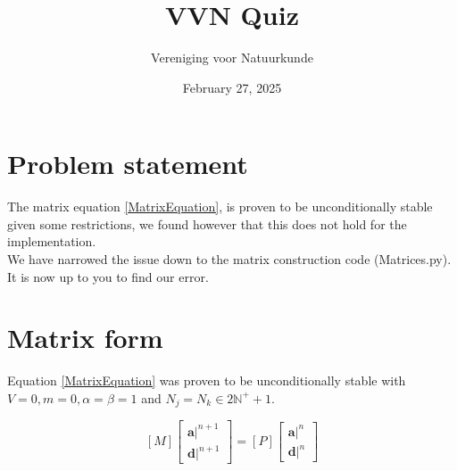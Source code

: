 \documentclass[final, 11pt]{article}
\title{VVN Quiz}
\date{February 27, 2025}
\author{Vereniging voor Natuurkunde}
\begin{document}
\maketitle

\section{Problem statement}
The matrix equation \ref{MatrixEquation}, is proven to be unconditionally stable given some restrictions, we found however that this does not hold for the implementation.
\\
We have narrowed the issue down to the matrix construction code (Matrices.py).
\\
It is now up to you to find our error.

\pagebreak

\section{Matrix form}
Equation \ref{MatrixEquation} was proven to be unconditionally stable with \(V=0, m=0, \alpha=\beta=1\) and \( N_j = N_k \in 2\mathbb{N}^{+}+1\).

\begin{equation}
    \label{MatrixEquation}
    \left[M\right]\left[\begin{matrix*}
        \boldsymbol{a}\vert^{n+1}\\\boldsymbol{d}\vert^{n+1}
    \end{matrix*}\right] = \left[P\right]\left[\begin{matrix*}
        \boldsymbol{a}\vert^{n}\\\boldsymbol{d}\vert^{n}
    \end{matrix*}\right]
\end{equation}
\end{document}
